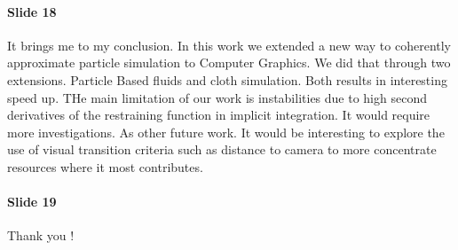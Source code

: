 \documentclass[twocolumn]{article}
\begin{document}
\paragraph{Slide 18}
It brings me to my conclusion.
In this work we extended a new way to coherently approximate particle simulation to Computer Graphics.
We did that through two extensions. 
Particle Based fluids and cloth simulation.
Both results in interesting speed up.
THe main limitation of our work is instabilities due to high second derivatives of the restraining function in implicit integration.
It would require more investigations.
As other future work.
It would be interesting to explore the use of visual transition criteria such as distance to camera to more concentrate resources where it most contributes.
\paragraph{Slide 19}
Thank you !


%
%
\end{document}
